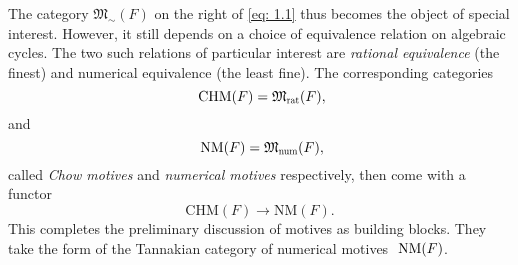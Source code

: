 \documentclass[preprint,12pt, leqno]{elsarticle}
\newcommand{\fM}{\mathfrak{M}}
\newcommand{\ubf}[1]{\textit{#1}}
\numberwithin{equation}{section}
\theoremstyle{named}
\begin{document}
The category $\fM_{\sim}(F)$ on the right of \eqref{eq: 1.1} thus becomes the object of special interest. However, it still depends on a choice of  equivalence relation \say{$\sim$} on algebraic cycles. The two such relations of particular interest are \ubf{rational equivalence} (the finest) and numerical equivalence (the least fine). The corresponding categories
\begin{equation*}
     \mbox{ \mbox{CHM}}(F) =  \fM_{\scalebox{0.7}{\mbox{rat}}}(F),  
\end{equation*}
and
\begin{equation*}
    \mbox{ \mbox{NM}}(F) = \fM_{\scalebox{0.7}{\mbox{num}}}(F), 
\end{equation*}
called \ubf{Chow motives} and \ubf{numerical motives} respectively, then come with a functor
\begin{equation}\label{eq: 1.2 FC}
      \mbox{CHM}(F)\longrightarrow  \mbox{NM}(F).
 \end{equation}
This completes the preliminary discussion of motives as building blocks. They take the form of the Tannakian category of numerical motives $\mbox{ \mbox{NM}}(F)$.
\end{document}
